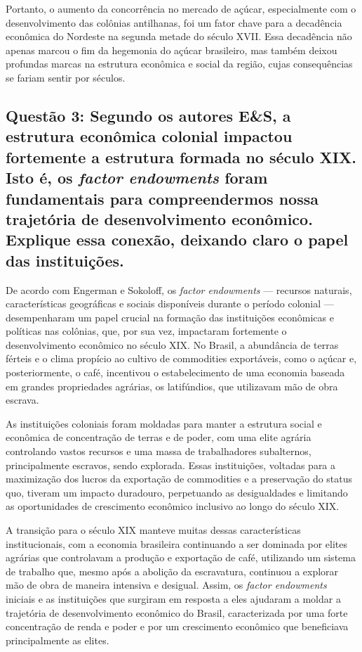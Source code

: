 \documentclass[a4paper,12pt]{article}[abntex2]
\begin{document}
Portanto, o aumento da concorrência no mercado de açúcar, especialmente com o desenvolvimento das colônias antilhanas, foi um fator chave para a decadência econômica do Nordeste na segunda metade do século XVII. Essa decadência não apenas marcou o fim da hegemonia do açúcar brasileiro, mas também deixou profundas marcas na estrutura econômica e social da região, cujas consequências se fariam sentir por séculos.

\subsection{\textbf{Questão 3: Segundo os autores E\&S, a estrutura econômica colonial impactou fortemente a estrutura formada no século XIX. Isto é, os \textit{factor endowments} foram fundamentais para compreendermos nossa trajetória de desenvolvimento econômico. Explique essa conexão, deixando claro o papel das instituições.}}

De acordo com Engerman e Sokoloff, os \textit{factor endowments} — recursos naturais, características geográficas e sociais disponíveis durante o período colonial — desempenharam um papel crucial na formação das instituições econômicas e políticas nas colônias, que, por sua vez, impactaram fortemente o desenvolvimento econômico no século XIX. No Brasil, a abundância de terras férteis e o clima propício ao cultivo de commodities exportáveis, como o açúcar e, posteriormente, o café, incentivou o estabelecimento de uma economia baseada em grandes propriedades agrárias, os latifúndios, que utilizavam mão de obra escrava.

As instituições coloniais foram moldadas para manter a estrutura social e econômica de concentração de terras e de poder, com uma elite agrária controlando vastos recursos e uma massa de trabalhadores subalternos, principalmente escravos, sendo explorada. Essas instituições, voltadas para a maximização dos lucros da exportação de commodities e a preservação do status quo, tiveram um impacto duradouro, perpetuando as desigualdades e limitando as oportunidades de crescimento econômico inclusivo ao longo do século XIX.

A transição para o século XIX manteve muitas dessas características institucionais, com a economia brasileira continuando a ser dominada por elites agrárias que controlavam a produção e exportação de café, utilizando um sistema de trabalho que, mesmo após a abolição da escravatura, continuou a explorar mão de obra de maneira intensiva e desigual. Assim, os \textit{factor endowments} iniciais e as instituições que surgiram em resposta a eles ajudaram a moldar a trajetória de desenvolvimento econômico do Brasil, caracterizada por uma forte concentração de renda e poder e por um crescimento econômico que beneficiava principalmente as elites.
\end{document}

